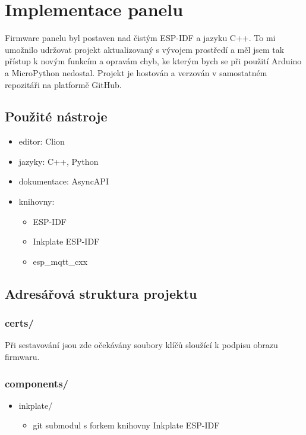 \section{Implementace panelu}
Firmware panelu byl postaven nad čistým ESP-IDF a jazyku C++. To mi umožnilo udržovat projekt aktualizovaný s vývojem prostředí a měl jsem tak přístup k novým funkcím a opravám chyb, ke kterým bych se při použití Arduino a MicroPython nedostal. Projekt je hostován a verzován v samostatném repozitáři na platformě GitHub.

\subsection{Použité nástroje}
\begin{itemize}
    \item editor: Clion
    \item jazyky: C++, Python
    \item dokumentace: AsyncAPI
    \item knihovny:
        \begin{itemize}
            \item ESP-IDF
            \item Inkplate ESP-IDF
            \item esp\_mqtt\_cxx
        \end{itemize}
\end{itemize}

\subsection{Adresářová struktura projektu}
\subsubsection*{certs/}
Při sestavování jsou zde očekávány soubory klíčů sloužící k podpisu obrazu firmwaru.

\subsubsection*{components/}
\begin{itemize}
    \item inkplate/
    \begin{itemize}
        \item git submodul s forkem knihovny Inkplate ESP-IDF
    \end{itemize}
\end{itemize}

